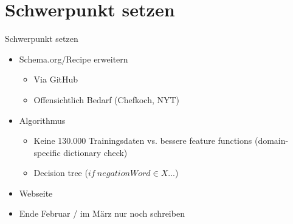 \documentclass[12pt]{beamer}
\begin{document}
\section{Schwerpunkt setzen}
\begin{frame}{Schwerpunkt setzen}
	\begin{itemize}
		\item Schema.org/Recipe erweitern
			\begin{itemize}
				\item Via GitHub
				\item Offensichtlich Bedarf (Chefkoch, NYT)
			\end{itemize}
		\item Algorithmus
		\begin{itemize}
			\item Keine 130.000 Trainingsdaten vs. bessere feature functions (domain-specific dictionary check)
			\item Decision tree ($if\ negationWord \in X...$)
		\end{itemize}
		\item Webseite
		
		\vspace{0.5cm}
		\item Ende Februar / im März nur noch schreiben
	\end{itemize}
\end{frame}
\end{document}
